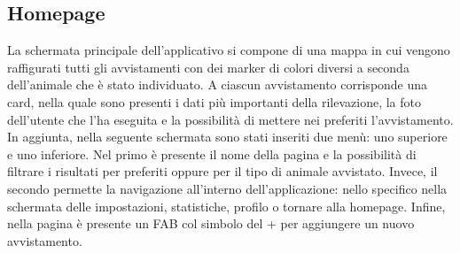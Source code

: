\documentclass[a4paper,final,12pt]{report}
\begin{document}
\subsection{Homepage}
La schermata principale dell'applicativo si compone di una mappa in cui vengono raffigurati tutti gli avvistamenti con dei marker di colori diversi a seconda dell'animale che è stato individuato. A ciascun avvistamento corrisponde una card, nella quale sono presenti i dati più importanti della rilevazione, la foto dell'utente che l'ha eseguita e la possibilità di mettere nei preferiti l'avvistamento. In aggiunta, nella seguente schermata sono stati inseriti due menù: uno superiore e uno inferiore. Nel primo è presente il nome della pagina e la possibilità di filtrare i risultati per preferiti oppure per il tipo di animale avvistato. Invece, il secondo permette la navigazione all'interno dell'applicazione: nello specifico nella schermata delle impostazioni, statistiche, profilo o tornare alla homepage. Infine, nella pagina è presente un FAB col simbolo del + per aggiungere un nuovo avvistamento.
\end{document}

